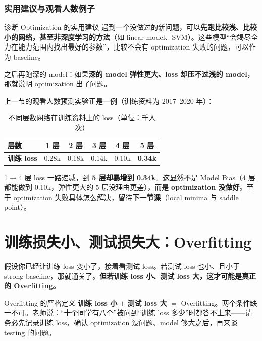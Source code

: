 \documentclass[a4paper]{article}
\begin{document}
\subsubsection{实用建议与观看人数例子}

\begin{knowledgebox}{诊断 Optimization 的实用建议}
    遇到一个没做过的新问题，可以\textbf{先跑比较浅、比较小的网络，甚至非深度学习的方法}（如 linear model、SVM）。这些模型``会竭尽全力在能力范围内找出最好的参数''，比较不会有 optimization 失败的问题，可以作为 baseline。

    之后再跑深的 model：如果\textbf{深的 model 弹性更大、loss 却压不过浅的 model}，那就说明 optimization 出了问题。
\end{knowledgebox}

上一节的观看人数预测实验正是一例（训练资料为 2017--2020 年）：

\begin{table}[H]
    \centering
    \caption{不同层数网络在训练资料上的 loss（单位：千人次）}
    \label{tab:layers}
    \begin{tabular}{lccccc}
        \toprule
        \textbf{层数} & 1 层 & 2 层 & 3 层 & 4 层 & \textbf{5 层} \\
        \midrule
        \textbf{训练 loss} & 0.28k & 0.18k & 0.14k & 0.10k & \textbf{0.34k} \\
        \bottomrule
    \end{tabular}
\end{table}

1$\to$4 层 loss 一路递减，到 \textbf{5 层却暴增到 0.34k}。这显然不是 Model Bias（4 层都能做到 0.10k，弹性更大的 5 层没理由更差），而是 \textbf{optimization 没做好}。至于 optimization 失败具体怎么解决，留待\textbf{下一节课}（local minima 与 saddle point）。

\section{训练损失小、测试损失大：Overfitting}

假设你已经让训练 loss 变小了，接着看测试 loss。若测试 loss 也小、且小于 strong baseline，那就通关了。\textbf{但若训练 loss 小、测试 loss 大，这才可能是真正的 Overfitting。}

\begin{warningbox}{Overfitting 的严格定义}
    \textbf{训练 loss 小} $+$ \textbf{测试 loss 大} $=$ Overfitting。两个条件缺一不可。老师说：``十个同学有八个''被问到``训练 loss 多少''时都答不上来——请务必先记录训练 loss，确认 optimization 没问题、model 够大之后，再来谈 testing 的问题。
\end{warningbox}
\end{document}
